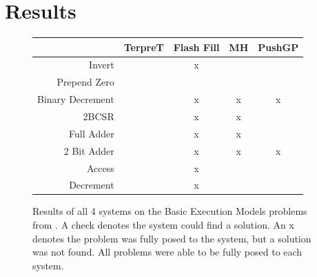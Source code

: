 \section{Results}


\begin{figure}
\begin{tabular}{ r | c c c c }
	& TerpreT & Flash Fill & MH & PushGP \\
	\hline
	Invert & \checkmark & x & \checkmark & \checkmark \\
	Prepend Zero & \checkmark & \checkmark & \checkmark & \checkmark \\
	Binary Decrement & \checkmark & x & x & x \\
	2BCSR & \checkmark & x & x & \checkmark \\
	Full Adder & \checkmark & x & x & \checkmark \\
	2 Bit Adder & \checkmark & x & x & x \\
	Access & \checkmark & x & \checkmark & \checkmark \\
	Decrement & \checkmark & x & \checkmark & \checkmark \\
\end{tabular}
\caption{Results of all 4 systems on the Basic Execution Models problems from \cite{Gaunt2016}.  A check denotes the system could find a solution. An x denotes the problem was fully posed to the system, but a solution was not found. All problems were able to be fully posed to each system.}
\label{fig:results1}
\end{figure}

